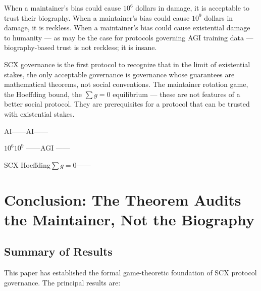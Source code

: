 \documentclass[12pt,a4paper]{article}
\theoremstyle{remark}
\begin{document}
When a maintainer's bias could cause $10^6$ dollars in damage, it is acceptable
to trust their biography. When a maintainer's bias could cause $10^9$ dollars in
damage, it is reckless. When a maintainer's bias could cause existential damage
to humanity — as may be the case for protocols governing AGI training data —
biography-based trust is not reckless; it is insane.

SCX governance is the first protocol to recognize that in the limit of
existential stakes, the only acceptable governance is governance whose
guarantees are mathematical theorems, not social conventions. The maintainer
rotation game, the Hoeffding bound, the $\sum g = 0$ equilibrium — these are
not features of a better social protocol. They are prerequisites for a protocol
that can be trusted with existential stakes.

\noindent\textbf{}
AI——AI——



$10^6$$10^9$
——AGI
——

SCX
Hoeffding$\sum g = 0$——


\newpage

\section{}
\section{Conclusion: The Theorem Audits the Maintainer, Not the Biography}

\subsection{Summary of Results}

This paper has established the formal game-theoretic foundation of SCX protocol
governance. The principal results are:
\end{document}
